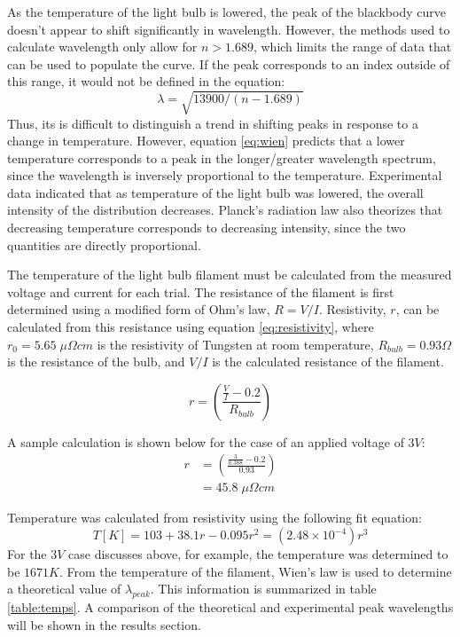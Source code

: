 \documentclass[a4paper]{article}
\begin{document}
\qq As the temperature of the light bulb is lowered, the peak of the blackbody curve doesn't appear to shift significantly in wavelength. However, the methods used to calculate wavelength only allow for $n > 1.689$, which limits the range of data that can be used to populate the curve. If the peak corresponds to an index outside of this range, it would not be defined in the equation: $$\lambda = \sqrt{13900/(n-1.689)}$$ Thus, its is difficult to distinguish a trend in shifting peaks in response to a change in temperature. However, equation \ref{eq:wien} predicts that a lower temperature corresponds to a peak in the longer/greater wavelength spectrum, since the wavelength is inversely proportional to the temperature. Experimental data indicated that as temperature of the light bulb was lowered, the overall intensity of the distribution decreases. Planck's radiation law also theorizes that decreasing temperature corresponds to decreasing intensity, since the two quantities are directly proportional.

\qq The temperature of the light bulb filament must be calculated from the measured voltage and current for each trial. The resistance of the filament is first determined using a modified form of Ohm's law, $R=V/I$. Resistivity, $r$, can be calculated from this resistance using equation \ref{eq:resistivity}, where $r_0 = 5.65 \; \mu \Omega cm$ is the resistivity of Tungsten at room temperature, $R_{bulb}=0.93 \Omega$ is the resistance of the bulb, and $V/I$ is the calculated resistance of the filament. 

\begin{equation}
\label{eq:resistivity}
r =
\left(
\frac{\frac{V}{I}-0.2}{R_{bulb}}
\right)
\end{equation}

A sample calculation is shown below for the case of an applied voltage of $3V$:
\begin{align*}
r &=
\left(
\frac{\frac{3}{0.388}-0.2}{0.93}
\right) \\
&= 45.8 \; \mu \Omega cm
\end{align*}

Temperature was calculated from resistivity using the following fit equation:
$$T[K] = 103 + 38.1r - 0.095r^2 = (2.48\times 10^{-4}) r^3$$
For the $3V$ case discusses above, for example, the temperature was determined to be $1671K$. From the temperature of the filament, Wien's law is used to determine a theoretical value of $\lambda_{peak}$. This information is summarized in table \ref{table:temps}. A comparison of the theoretical and experimental peak wavelengths will be shown in the results section.
\end{document}

